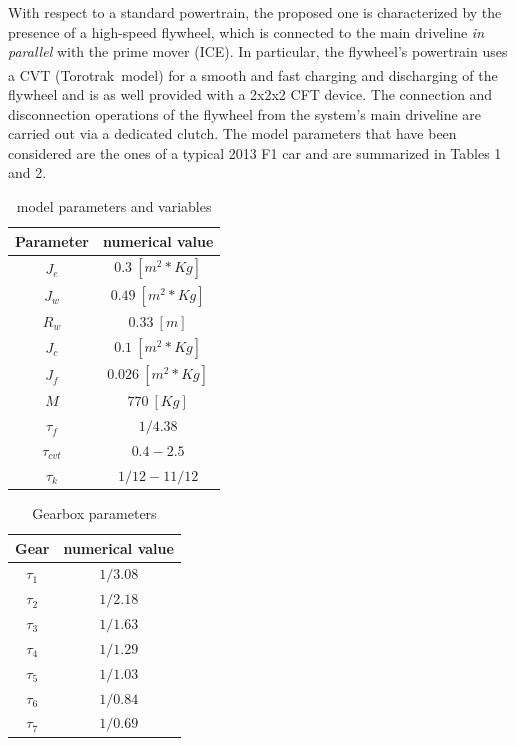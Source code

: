 \documentclass[11pt]{article}
\begin{document}
With respect to a standard powertrain, the proposed one is characterized by the presence of a high-speed flywheel, which is connected to the main driveline \textit{in parallel} with the prime mover (ICE). In particular, the flywheel's powertrain uses a CVT (Torotrak\textsuperscript\textregistered\ model) for a smooth and fast charging and discharging of the flywheel and is as well provided with a 2x2x2 CFT device. The connection and disconnection operations of the flywheel from the system's main driveline are carried out via a dedicated clutch. The model parameters that have been considered are the ones of a typical 2013 F1 car and are summarized in Tables 1 and 2.

\begin{table}[H]
\centering
\begin{tabular}{|c|c|}
 \hline 
 Parameter & numerical value\\ 
 \hline 
 $J_e$ &  $0.3\ [m^2*Kg]$\\   
 $J_w$ & $0.49\ [m^2*Kg]$ \\ 
 $R_w$ & $0.33\ [m]$ \\  
 $J_c$ & $0.1\ [m^2*Kg]$ \\ 
 $J_f$ & $0.026\ [m^2*Kg]$ \\  
 $M$ & $770\ [Kg]$ \\
 $\tau_f$ & $1/4.38$ \\
 $\tau_{cvt}$ & $0.4-2.5$ \\
 $\tau_k$ & $1/12-11/12$ \\  
 \hline 
\end{tabular} 
\label{params}
\caption{model parameters and variables}
\end{table}

\begin{table}[H]
\centering
\begin{tabular}{|c|c|}
 \hline 
 Gear & numerical value\\ 
 \hline 
 $\tau_1$ &  $1/3.08$\\  
 $\tau_2$ & $1/2.18$ \\ 
 $\tau_3$ & $1/1.63$ \\ 
 $\tau_4$ & $1/1.29$ \\  
 $\tau_5$ & $1/1.03$ \\ 
 $\tau_6$ & $1/0.84$ \\  
 $\tau_7$ & $1/0.69$ \\  
 \hline 
\end{tabular} 
\caption{Gearbox parameters }
\end{table}
\end{document}
